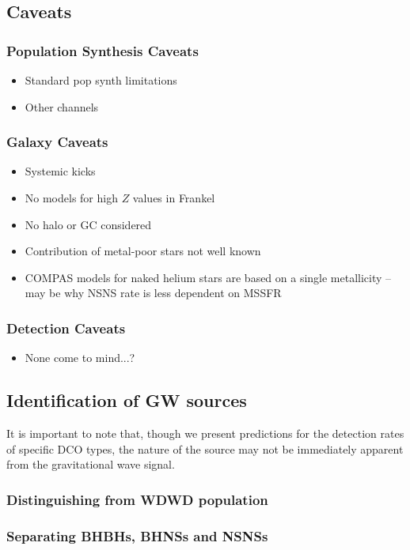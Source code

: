 \subsection{Caveats}\label{sec:caveats}

\subsubsection{Population Synthesis Caveats}
\begin{itemize}
    \item Standard pop synth limitations
    \item Other channels
\end{itemize}

\subsubsection{Galaxy Caveats}
\begin{itemize}
    \item Systemic kicks
    \item No models for high $Z$ values in Frankel
    \item No halo or GC considered %
    \item Contribution of metal-poor stars not well known
    \item COMPAS models for naked helium stars are based on a single metallicity -- may be why NSNS rate is less dependent on MSSFR
\end{itemize}

\subsubsection{Detection Caveats}
\begin{itemize}
    \item None come to mind...?
\end{itemize}

\subsection{Identification of GW sources}
It is important to note that, though we present predictions for the detection rates of specific DCO types, the nature of the source may not be immediately apparent from the gravitational wave signal.

\subsubsection{Distinguishing from WDWD population}
\subsubsection{Separating BHBHs, BHNSs and NSNSs}
